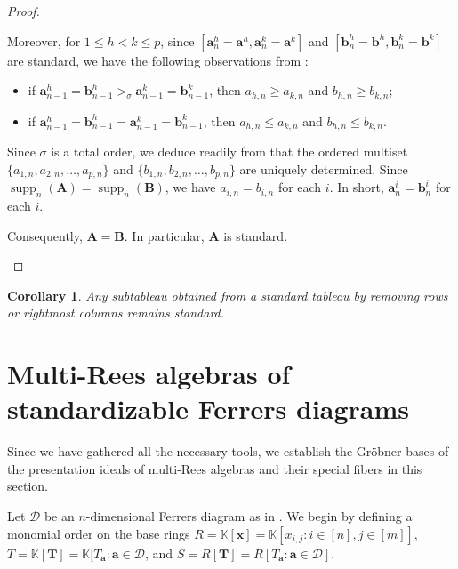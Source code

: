 \documentclass[11pt,a4paper,reqno,dvipsnames]{amsart}
\theoremstyle{plain}
\newtheorem{Corollary}[Theorem]{Corollary}
\theoremstyle{definition}
\newtheorem{Assumptions and Discussion}[Theorem]{Assumptions and Discussion}
\theoremstyle{remark}
\def\KK{{\mathbb K}}
\def\supp{\operatorname{supp}}
\newcommand\bda{{\bm a}}
\newcommand\bdb{{\bm b}}
\newcommand\bdT{{\bm T}}
\newcommand\bdx{{\bm x}}
\newcommand\bfA{\mathbf{A}}
\newcommand\bfB{\mathbf{B}}
\newcommand\calD{\mathcal{D}}
\begin{document}
\begin{proof}
\begin{enumerate}[a]
            Moreover, for $1\le h< k \le p$, since $[{\bda}^h_{n}={\bda}^h, {\bda}^k_{n}={\bda}^k]$ and $[{\bdb}^h_{n}={\bdb}^h, {\bdb}^k_{n}={\bdb}^k]$ are standard, we have the following observations from :
            \begin{itemize}
                \item if $\bda^h_{n-1}=\bdb^h_{n-1}>_{\sigma} \bda^k_{n-1}=\bdb^k_{n-1}$, then ${a}_{h,n}\ge {a}_{k,n}$ and $b_{h,n}\ge b_{k,n}$;
                \item if $\bda^h_{n-1}=\bdb^h_{n-1}=\bda^k_{n-1}=\bdb^k_{n-1}$, then ${a}_{h,n} \le {a}_{k,n}$ and $b_{h,n}\le b_{k,n}$.
            \end{itemize}
            Since $\sigma$ is a total order, we deduce readily from  that the ordered multiset $\{a_{1,n},a_{2,n},\dots,a_{p,n}\}$ and $\{b_{1,n},b_{2,n},\dots,b_{p,n}\}$ are uniquely determined. Since $\supp_{n}(\bfA)=\supp_{n}(\bfB)$, we have $a_{i,n}=b_{i,n}$ for each $i$. In short, $\bda^i_{n}=\bdb^i_{n}$ for each $i$.

            Consequently, $\bfA=\bfB$. In particular, $\bfA$ is standard.
            \qedhere
    \end{enumerate}
\end{proof}

\begin{Corollary}
    \label{cor:sub_standard} 
    Any subtableau obtained from a standard tableau by removing rows or rightmost columns remains standard.
\end{Corollary}


\section{Multi-Rees algebras of standardizable Ferrers diagrams}

Since we have gathered all the necessary tools, we establish the Gr\"{o}bner bases of the presentation ideals of multi-Rees algebras and their special fibers in this section. 

Let $\calD$ be an $n$-dimensional Ferrers diagram as in . We begin by defining a monomial order on the base rings $R=\KK[\bdx]= \KK[x_{i,j} : i\in [n], j\in [m]]$, $T= \KK[\bdT]= \KK[T_{\bda}:\bda\in \calD$, and $S=R[\bdT]=R[T_\bda:\bda\in \calD]$.
\end{document}
